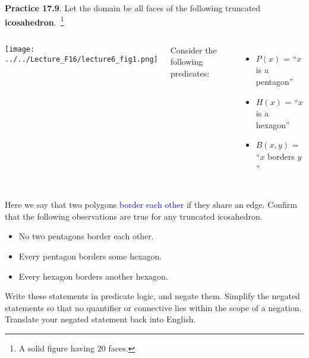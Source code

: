 \documentclass[aspectratio=169]{beamer}
\providecommand{\Blue}[1]{\textcolor{blue}{#1}}
\begin{document}
 \begin{frame}[plain]{}
 
 {\bf Practice 17.9}. 
  Let the domain be all faces of the following truncated {\bf icosahedron}.~\footnote{ 
    A solid figure having 20 faces. }
  \begin{columns}[c]
      \begin{center}
     \texttt{[image: ../../Lecture\_F16/lecture6\_fig1.png]}
  \end{center}
    Consider the following predicates:
  {\small
  \begin{itemize}
   \item $P(x)$ = ``$x$ is a pentagon''
   \item $H(x)$ = ``$x$ is a hexagon''
   \item $B(x, y)$ = ``$x$ borders $y$''
  \end{itemize}
  }
  \end{columns}
  Here we say that two polygons \Blue{border each other} if they share an edge.
    Confirm that the following observations are true for any truncated icosahedron.
   \begin{itemize}
    \item No two pentagons border each other.
    \item Every pentagon borders some hexagon.
    \item Every hexagon borders another hexagon.
   \end{itemize}
   Write these statements in predicate logic, and negate them. 
   Simplify the negated statements so that no quantifier or connective lies within
   the scope of a negation. Translate your negated statement back into English.  
  
 \end{frame}
\end{document}
